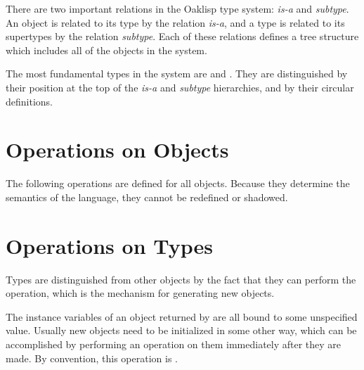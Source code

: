 There are two important relations in the Oaklisp type system: {\it
is-a} and {\it subtype}.  An object is related to its type by the
relation {\it is-a}, and a type is related to its supertypes by the
relation {\it subtype}.  Each of these relations defines a tree
structure which includes all of the objects in the system.

The most fundamental types in the system are  and
.  They are distinguished by their position at the top of
the {\it is-a} and {\it subtype} hierarchies, and by their circular
definitions.



\section{Operations on Objects}

The following operations are defined for all objects.  Because they
determine the semantics of the language, they cannot be redefined or shadowed.





\section{Operations on Types}

Types are distinguished from other objects by the fact that they can
perform the  operation, which is the mechanism for generating
new objects.


The instance variables of an object returned by  are
all bound to some unspecified value.  Usually new objects need to be
initialized in some other way, which can be accomplished by performing
an operation on them immediately after they are made.  By convention,
this operation is .


